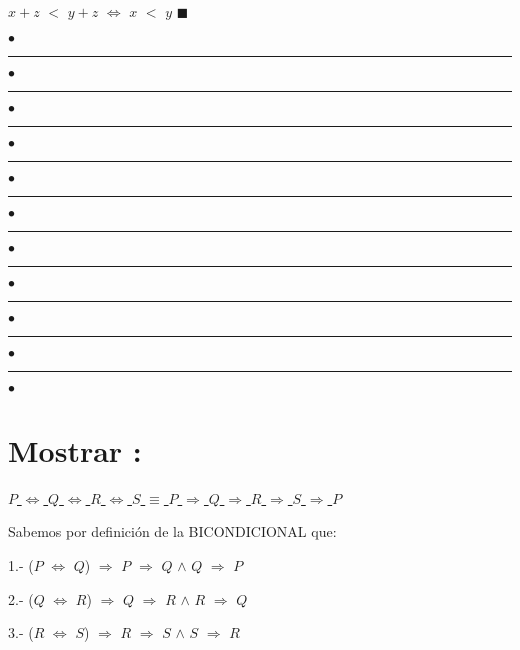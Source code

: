 \documentclass[12pt]{article}
\renewcommand{\qedsymbol}{$\blacksquare$}
\begin{document}
\hspace{2.5cm}  $x+z$ $<$ $y+z$ $\Longleftrightarrow$ $x$ $<$ $y$ \hspace{0.5cm} \qedsymbol \vspace{0.7cm}


\begin{center}
{\textcolor{trueblue}
{
$\bullet$  \rule{10mm}{0.3mm} $\bullet$ \rule{10mm}{0.3mm} $\bullet$ \rule{10mm}{0.3mm}  $\bullet$  \rule{10mm}{0.3mm} $\bullet$ \rule{10mm}{0.3mm} $\bullet$ \rule{10mm}{0.3mm}  $\bullet$  \rule{10mm}{0.3mm}  $\bullet$  \rule{10mm}{0.3mm}  $\bullet$  \rule{10mm}{0.3mm} $\bullet$ \rule{10mm}{0.3mm} $\bullet$ }
}
\end{center} \vspace{0.5cm}

\section{Mostrar {}:} \vspace{0.2cm}

\begin{center} 
{\underline
    {
        {\Large{$P$ $\Longleftrightarrow$ $Q$ $\Longleftrightarrow$ $R$ $\Longleftrightarrow$ $S$ $\equiv$ $P$ $\Longrightarrow$ $Q$ $\Longrightarrow$ $R$ $\Longrightarrow$ $S$ $\Longrightarrow$ $P$ }}
    }
}
\end{center} \vspace{0.5cm}

{}

{\textcolor{carrotorange}{Sabemos por definición de la {\textcolor{pakistangreen}{BICONDICIONAL}} que}}: \vspace{0.5cm}

1.- ($P$ $\Longleftrightarrow$ $Q$) $\Longrightarrow$ $P$ $\Longrightarrow$ $Q$ $\wedge$ $Q$ $\Longrightarrow$ $P$ 

2.- ($Q$ $\Longleftrightarrow$ $R$) $\Longrightarrow$ $Q$ $\Longrightarrow$ $R$ $\wedge$ $R$ $\Longrightarrow$ $Q$ 

3.- ($R$ $\Longleftrightarrow$ $S$) $\Longrightarrow$ $R$ $\Longrightarrow$ $S$ $\wedge$ $S$ $\Longrightarrow$ $R$ \vspace{0.5cm} 
\end{document}
